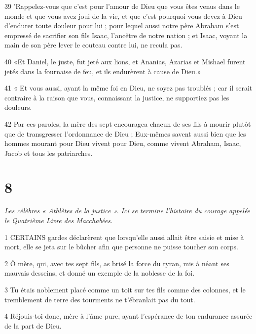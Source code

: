 \par 39 'Rappelez-vous que c'est pour l'amour de Dieu que vous êtes venus dans le monde et que vous avez joui de la vie, et que c'est pourquoi vous devez à Dieu d'endurer toute douleur pour lui ; pour lequel aussi notre père Abraham s'est empressé de sacrifier son fils Isaac, l'ancêtre de notre nation ; et Isaac, voyant la main de son père lever le couteau contre lui, ne recula pas.

\par 40 «Et Daniel, le juste, fut jeté aux lions, et Ananias, Azarias et Mishael furent jetés dans la fournaise de feu, et ils endurèrent à cause de Dieu.»

\par 41 « Et vous aussi, ayant la même foi en Dieu, ne soyez pas troublés ; car il serait contraire à la raison que vous, connaissant la justice, ne supportiez pas les douleurs.

\par 42 Par ces paroles, la mère des sept encouragea chacun de ses fils à mourir plutôt que de transgresser l'ordonnance de Dieu ; Eux-mêmes savent aussi bien que les hommes mourant pour Dieu vivent pour Dieu, comme vivent Abraham, Isaac, Jacob et tous les patriarches.



\chapter{8}

\par \textit{Les célèbres « Athlètes de la justice ». Ici se termine l'histoire du courage appelée le Quatrième Livre des Macchabées.}

\par 1 CERTAINS gardes déclarèrent que lorsqu'elle aussi allait être saisie et mise à mort, elle se jeta sur le bûcher afin que personne ne puisse toucher son corps.

\par 2 Ô mère, qui, avec tes sept fils, as brisé la force du tyran, mis à néant ses mauvais desseins, et donné un exemple de la noblesse de la foi.

\par 3 Tu étais noblement placé comme un toit sur tes fils comme des colonnes, et le tremblement de terre des tourments ne t'ébranlait pas du tout.

\par 4 Réjouis-toi donc, mère à l'âme pure, ayant l'espérance de ton endurance assurée de la part de Dieu.

